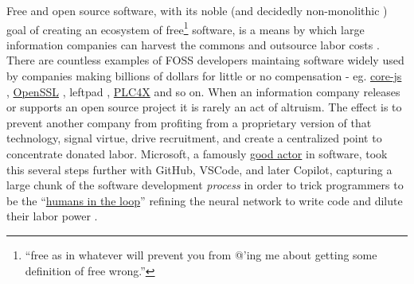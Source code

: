 Free and open source software, with its noble (and decidedly
non-monolithic \cite{liuFreedomIsnFree2018} ) goal of creating an
ecosystem of free\footnote{``free as in whatever will prevent you from
  @'ing me about getting some definition of free wrong.''} software, is
a means by which large information companies can harvest the commons and
outsource labor costs \cite{warkHackerManifesto2004, goldsmithOriginalSinFree2019, hallidayOpenSourceNot2018, hunterReclaimingComputingCommons2016, hornPostOpenSource2020} . There
are countless examples of FOSS developers maintaing software widely used
by companies making billions of dollars for little or no compensation -
eg.
\href{https://github.com/zloirock/core-js/blob/master/docs/2023-02-14-so-whats-next.md}{core-js}
\cite{pushkarevWhatNext2023} ,
\href{https://veridicalsystems.com/blog/of-money-responsibility-and-pride/index.html}{OpenSSL}
\cite{marquessSpeedsFeedsMoney2014} , leftpad \cite{gallagherRagequitCoderUnpublished2016} ,
\href{https://github.com/chrisdutz/blog/blob/main/plc4x/free-trial-expired.adoc}{PLC4X}
\cite{dutzYourFreeTrial2022}  and so on. When an information
company releases or supports an open source project it is rarely an act
of altruism. The effect is to prevent another company from profiting
from a proprietary version of that technology, signal virtue, drive
recruitment, and create a centralized point to concentrate donated
labor. Microsoft, a famously
\href{https://en.wikipedia.org/wiki/Embrace,_extend,_and_extinguish}{good
actor} in software, took this several steps further with GitHub, VSCode,
and later Copilot, capturing a large chunk of the software development
\emph{process} in order to trick programmers to be the
``\href{https://twitter.com/json_dirs/status/1410897161277956097}{humans
in the loop}'' refining the neural network to write code and dilute
their labor power \cite{butterickGitHubCopilotInvestigation2022, butterickGitHubCopilotLitigation2022, olearyVSCodeWhat2022, VSCodiumOpenSource} .

